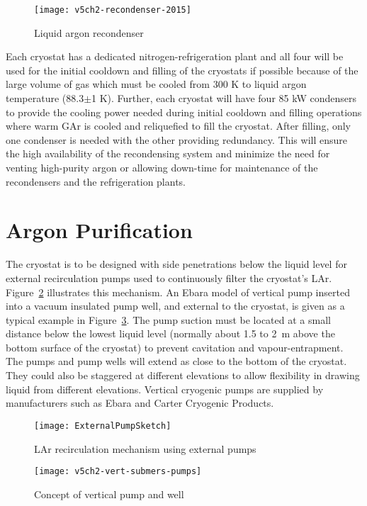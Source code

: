 \begin{figure}[htbp]
\centering
\texttt{[image: v5ch2-recondenser-2015]}
\caption{Liquid argon recondenser}
\label{fig:v5ch2-recondenser-sept-2011}
\end{figure}

Each cryostat has a dedicated nitrogen-refrigeration plant 
and all four will be used for the initial cooldown and filling of the 
cryostats if possible because of the large volume of 
gas which must be cooled from 300 K to liquid
argon temperature (88.3$\pm$1 K). Further, each cryostat will
have four 85 kW condensers to 
provide the cooling power needed during initial 
cooldown and filling operations where warm GAr
is cooled and reliquefied to fill the cryostat.
After filling, only one condenser is needed with the
other providing redundancy.
This will ensure the high availability of the recondensing 
system and minimize the need for venting high-purity argon 
or allowing down-time for maintenance of
the recondensers and the refrigeration plants. 

\section{Argon Purification}
\label{subsec:argon-pur}
The cryostat is to be designed with side penetrations below the liquid level 
for external recirculation pumps used to continuously filter the cryostat's 
LAr. Figure~\ref{fig:external-pump} illustrates this mechanism. An Ebara 
model of vertical pump inserted into a vacuum insulated pump well, and 
external to the cryostat, is given 
as a typical example in Figure~\ref{fig:vert-submers-pumps}. The pump suction 
must be located at a small distance below the lowest liquid level 
(normally about 1.5 to 2~m above the bottom surface of the cryostat) 
to prevent cavitation and vapour-entrapment. The pumps and 
pump wells will extend as close to the bottom of the cryostat. They 
could also be staggered at different elevations to allow flexibility 
in drawing liquid from different 
elevations. Vertical cryogenic pumps are supplied by manufacturers 
such as Ebara and Carter Cryogenic Products. 

\begin{figure}[htbp]
\centering
\texttt{[image: ExternalPumpSketch]}
\caption{LAr recirculation mechanism using external pumps}
\label{fig:external-pump}
\end{figure}

\begin{figure}[htbp]
\centering
\texttt{[image: v5ch2-vert-submers-pumps]}
\caption{Concept of vertical pump and well}
\label{fig:vert-submers-pumps}
\end{figure}

